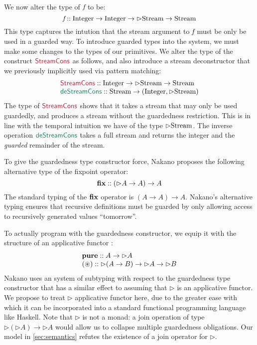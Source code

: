 We now alter the type of $\textit{f}$ to be:
\begin{displaymath}
  \textit{f} :: \textrm{Integer} \to \textrm{Integer} \to \rhd\textrm{Stream} \to \textrm{Stream}
\end{displaymath}
This type captures the intution that the stream argument to
$\textit{f}$ must be only be used in a guarded way. To introduce
guarded types into the system, we must make some changes to the types
of our primitives. We alter the type of the construct
$\cons{StreamCons}$ as follows, and also introduce a stream
deconstructor that we previously implicitly used via pattern matching:
\begin{displaymath}
  \begin{array}{l}
    \cons{StreamCons} :: \tyname{Integer} \to \rhd\tyname{Stream} \to \tyname{Stream} \\
    \elim{deStreamCons} :: \tyname{Stream} \to (\tyname{Integer}, \rhd\tyname{Stream})
  \end{array}
\end{displaymath}
The type of $\cons{StreamCons}$ shows that it takes a stream that may
only be used guardedly, and produces a stream without the guardedness
restriction. This is in line with the temporal intuition we have of
the type $\rhd\textrm{Stream}$. The inverse operation
$\elim{deStreamCons}$ takes a full stream and returns the integer and
the \emph{guarded} remainder of the stream.

To give the guardedness type constructor force, Nakano proposes the
following alternative type of the fixpoint operator:
\begin{displaymath}
  \textbf{fix} :: (\rhd A \to A) \to A
\end{displaymath}
The standard typing of the $\textbf{fix}$ operator is $(A \to A) \to
A$. Nakano's alternative typing ensures that recursive definitions
must be guarded by only allowing access to recursively generated
values ``tomorrow''.

To actually program with the guardedness constructor, we equip it with
the structure of an applicative functor \cite{paterson08applicative}:
\begin{displaymath}
  \begin{array}{l}
    \textbf{pure} :: A \to \rhd A \\
    \textbf{$(\circledast)$} :: \rhd (A \to B) \to \rhd A \to \rhd B
  \end{array}
\end{displaymath}
Nakano uses an system of subtyping with respect to the guardedness
type constructor that has a similar effect to assuming that $\rhd$ is
an applicative functor. We propose to treat $\rhd$ applicative functor
here, due to the greater ease with which it can be incorporated into a
standard functional programming language like Haskell. Note that
$\rhd$ is not a monad: a join operation of type $\rhd(\rhd A) \to \rhd
A$ would allow us to collapse multiple guardedness obligations. Our
model in \autoref{sec:semantics} refutes the existence of a join
operator for $\rhd$.

